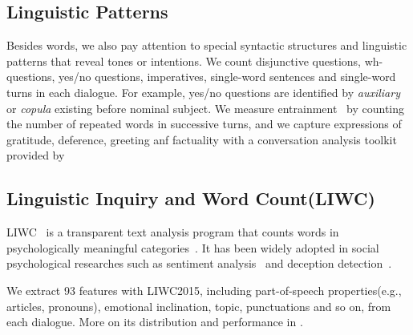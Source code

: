 \subsection*{Linguistic Patterns}
Besides words, we also pay attention to special syntactic structures 
and linguistic patterns that reveal tones or intentions. 
We count disjunctive questions, wh-questions, 
yes/no questions, imperatives, single-word sentences and 
single-word turns in each dialogue. 
For example, yes/no questions are identified by \textit{auxiliary} or 
\textit{copula} existing before nominal subject. 
We measure entrainment~\cite{entrainment} by counting the number of
repeated words in successive turns, 
and we capture expressions of gratitude, deference, greeting anf factuality with a conversation analysis toolkit provided by~\citeauthor{politeness}~ 



\subsection*{Linguistic Inquiry and Word Count(LIWC)}
LIWC~\cite{liwc} is a transparent text analysis program that counts words in psychologically 
meaningful categories~\cite{liwc2}. It has been widely adopted in social psychological researches 
such as sentiment analysis~\cite{sentiment} and deception detection~\cite{deception}.

We extract 93 features with LIWC2015, including part-of-speech properties(e.g., articles, pronouns), 
emotional inclination, topic, punctuations and so on, from each dialogue. More on its distribution and performance in .
